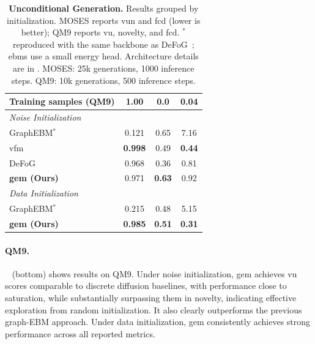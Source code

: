 \begin{table}[t]
\begin{subtable}[t]{\columnwidth}
\begin{tabular}{lccc}
\midrule
Training samples (QM9) & 1.00 & 0.0 & 0.04 \\
\midrule
\multicolumn{4}{l}{\textit{Noise Initialization}} \\
\midrule
GraphEBM$^*$~\citep{liu2021graphebm} & 0.121 & 0.65 & 7.16 \\
\gls{vfm}~\citep{eijkelboom2024vfm} & \textbf{0.998} & 0.49 & \textbf{0.44} \\
DeFoG~\citep{qinmadeira2024defog} & 0.968 & 0.36 & 0.81 \\
\textbf{\gls{gem} (Ours)} & 0.971 & \textbf{0.63} & 0.92 \\
\midrule
\multicolumn{4}{l}{\textit{Data Initialization}} \\
\midrule
GraphEBM$^*$~\citep{liu2021graphebm} & 0.215 & 0.48 & 5.15 \\
\textbf{\gls{gem} (Ours)} & \textbf{0.985} & \textbf{0.51} & \textbf{0.31} \\
\bottomrule
\end{tabular}
\end{subtable}
\vspace{1em}
\caption{\footnotesize \textbf{Unconditional Generation.} Results grouped by initialization. MOSES
reports \acrshort{vun} and \acrshort{fcd} (lower is better); QM9 reports \gls{vu}, novelty,
and \acrshort{fcd}. $^*$ reproduced with the same backbone as DeFoG~\citep{qinmadeira2024defog}; \glspl{ebm} use
a small energy head. Architecture details are in . MOSES: 25k
generations, 1000 inference steps. QM9: 10k generations, 500 inference steps.}
\label{tab:uncond-main}
\end{table}

\paragraph{QM9.} ~ (bottom) shows results on QM9. Under noise initialization, \gls{gem} achieves \gls{vu} scores comparable to discrete diffusion baselines, with performance close to saturation, while substantially surpassing them in novelty, indicating effective exploration from random initialization. It also clearly outperforms the previous graph-EBM approach. Under data initialization, \gls{gem} consistently achieves strong performance across all reported metrics.





